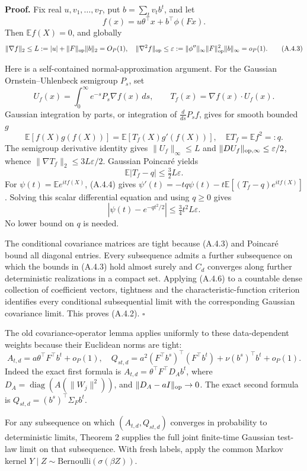 \documentclass[
  11pt,
  a4paper,
]{article}
\begin{document}
\textbf{Proof.} Fix real \(u,v_1,\ldots,v_T\), put \(b=\sum_tv_tb^t\),
and let \[
f(x)=u\theta^\top x+b^\top\phi(Fx).
\] Then \(\mathbb Ef(X)=0\), and globally \[
\|\nabla f\|_2\le L:=|u|+\|F\|_{\rm op}\|b\|_2=O_P(1),
\quad
\|\nabla^2 f\|_{\rm op}\le
\varepsilon:=\|\phi''\|_\infty\|F\|_{\rm op}^2\|b\|_\infty=o_P(1).
\tag{A.4.3}
\]

Here is a self-contained normal-approximation argument. For the Gaussian
Ornstein--Uhlenbeck semigroup \(P_s\), set \[
U_f(x)=\int_0^\infty e^{-s}P_s\nabla f(x)\,ds,
\qquad T_f(x)=\nabla f(x)\cdot U_f(x).
\] Gaussian integration by parts, or integration of \(\frac d{ds}P_sf\),
gives for smooth bounded \(g\) \[
\mathbb E[f(X)g(f(X))]=\mathbb E[T_f(X)g'(f(X))],
\quad\mathbb ET_f=\mathbb Ef^2=:q.
\tag{A.4.4}
\] The semigroup derivative identity gives \(\|U_f\|_\infty\le L\) and
\(\|DU_f\|_{\rm op,\infty}\le\varepsilon/2\), whence
\(\|\nabla T_f\|_2\le3L\varepsilon/2\). Gaussian Poincaré yields \[
\mathbb E|T_f-q|\le\tfrac32L\varepsilon. \tag{A.4.5}
\] For \(\psi(t)=\mathbb Ee^{itf(X)}\), (A.4.4) gives
\(\psi'(t)=-tq\psi(t)-t\mathbb E[(T_f-q)e^{itf(X)}]\). Solving this
scalar differential equation and using \(q\ge0\) gives \[
|\psi(t)-e^{-qt^2/2}|\le\tfrac34t^2L\varepsilon. \tag{A.4.6}
\] No lower bound on \(q\) is needed.

The conditional covariance matrices are tight because (A.4.3) and
Poincaré bound all diagonal entries. Every subsequence admits a further
subsequence on which the bounds in (A.4.3) hold almost surely and
\(C_d\) converges along further deterministic realizations in a compact
set. Applying (A.4.6) to a countable dense collection of coefficient
vectors, tightness and the characteristic-function criterion identifies
every conditional subsequential limit with the corresponding Gaussian
covariance limit. This proves (A.4.2). \(\square\)

The old covariance-operator lemma applies uniformly to these
data-dependent weights because their Euclidean norms are tight: \[
A_{t,d}=a\theta^\top F^\top b^t+o_P(1),
\quad
Q_{st,d}=a^2(F^\top b^s)^\top(F^\top b^t)+\nu(b^s)^\top b^t+o_P(1). \tag{A.4.7}
\] Indeed the exact first formula is
\(A_{t,d}=\theta^\top F^\top D_A b^t\), where
\(D_A=\operatorname{diag}(A(\|W_j\|^2))\), and
\(\|D_A-aI\|_{\rm op}\to0\). The exact second formula is
\(Q_{st,d}=(b^s)^\top\Sigma_Fb^t\).

For any subsequence on which \((A_{t,d},Q_{st,d})\) converges in
probability to deterministic limits, Theorem 2 supplies the full joint
finite-time Gaussian test-law limit on that subsequence. With fresh
labels, apply the common Markov kernel
\(Y\mid Z\sim\mathrm{Bernoulli}(\sigma(\beta Z))\).
\end{document}
